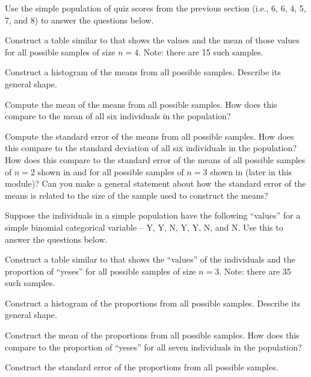 \documentclass[10pt,openany]{book}\usepackage[]{graphicx}\usepackage[]{color}
\begin{document}
\clearpage
\begin{exsection}
  \item \label{revex:SamplingDistn3} Use the simple population of quiz scores from the previous section (i.e., 6, 6, 4, 5, 7, and 8) to answer the questions below. 
    \begin{Enumerate}
      \item Construct a table similar to  that shows the values and the mean of those values for all possible samples of size $n=4$. Note: there are 15 such samples.
      \item Construct a histogram of the means from all possible samples. Describe its general shape.
      \item Compute the mean of the means from all possible samples. How does this compare to the mean of all six individuals in the population?
      \item Compute the standard error of the means from all possible samples. How does this compare to the standard deviation of all six individuals in the population?  How does this compare to the standard error of the means of all possible samples of $n=2$ shown in  and for all possible samples of $n=3$ shown in  (later in this module)?  Can you make a general statement about how the standard error of the means is related to the size of the sample used to construct the means?
    \end{Enumerate}

  \item \label{revex:SamplingDistp2} Suppose the individuals in a simple population have the following ``values'' for a simple binomial categorical variable -- Y, Y, N, Y, Y, N, and N. Use this to answer the questions below. 
    \begin{Enumerate}
      \item Construct a table similar to  that shows the ``values'' of the individuals and the proportion of ``yeses'' for all possible samples of size $n=3$. Note: there are 35 such samples.
      \item Construct a histogram of the proportions from all possible samples. Describe its general shape.
      \item Construct the mean of the proportions from all possible samples. How does this compare to the proportion of ``yeses'' for all seven individuals in the population?
      \item Construct the standard error of the proportions from all possible samples.
    \end{Enumerate}


\end{exsection}
\end{document}
